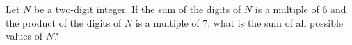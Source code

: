 Let $N$ be a two-digit integer. If the sum of the digits of $N$ is a multiple of $6$ and the product of the digits of $N$ is a multiple of $7$, what is the sum of all possible values of $N$?
